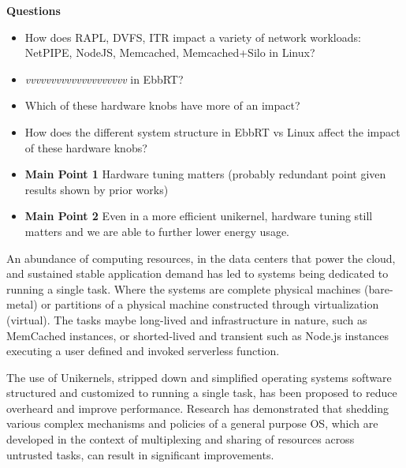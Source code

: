 \indent \textbf{Questions}
\begin{itemize}
    \item How does RAPL, DVFS, ITR impact a variety of network workloads: NetPIPE, NodeJS, Memcached, Memcached+Silo in Linux?
    \item \textit{vvvvvvvvvvvvvvvvvvvv} in EbbRT?
    \item Which of these hardware knobs have more of an impact?
    \item How does the different system structure in EbbRT vs Linux affect the impact of these hardware knobs?
    \item \textbf{Main Point 1} Hardware tuning matters (probably redundant point given results shown by prior works)
    \item \textbf{Main Point 2} Even in a more efficient unikernel, hardware tuning still matters and we are able to further lower energy usage.
\end{itemize}


An abundance of computing resources, in the data centers that power the cloud, and sustained stable application demand has led to systems being dedicated to running a single task.   Where the systems are complete physical machines (bare-metal) or partitions of a physical machine constructed through virtualization (virtual).  The tasks maybe long-lived and infrastructure in nature, such as MemCached instances,  or shorted-lived and transient such as Node.js instances executing a user defined and invoked serverless function. 

 The use of Unikernels, stripped down and simplified operating systems software structured and customized to running a single task, has been proposed to reduce overheard and improve performance.  Research has demonstrated that shedding various complex mechanisms and policies of a general purpose OS, which are developed in the context of multiplexing and sharing of resources across untrusted tasks, can result in significant improvements. 
   
